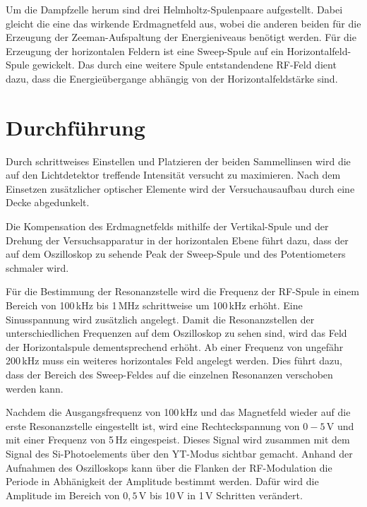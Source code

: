 \noindent Um die Dampfzelle herum sind drei Helmholtz-Spulenpaare aufgestellt. Dabei gleicht die eine das wirkende
Erdmagnetfeld aus, wobei die anderen beiden für die Erzeugung der Zeeman-Aufspaltung der
Energieniveaus benötigt werden. Für die Erzeugung der horizontalen Feldern ist eine Sweep-Spule auf ein Horizontalfeld-Spule
gewickelt. \newline
Das durch eine weitere Spule entstandendene RF-Feld dient dazu, dass die Energieübergange abhängig von
der Horizontalfeldstärke sind.

\section{Durchführung}
Durch schrittweises Einstellen und Platzieren der beiden Sammellinsen wird die auf den Lichtdetektor
treffende Intensität versucht zu maximieren. Nach dem Einsetzen zusätzlicher optischer Elemente wird
der Versuchausaufbau durch eine Decke abgedunkelt.

Die Kompensation des Erdmagnetfelds mithilfe der Vertikal-Spule und der Drehung der Versuchsapparatur in der
horizontalen Ebene führt dazu, dass der auf dem Oszilloskop zu sehende Peak der Sweep-Spule und des Potentiometers
schmaler wird.

Für die Bestimmung der Resonanzstelle wird die Frequenz der RF-Spule in einem Bereich von 100\,kHz bis
1\,MHz schrittweise um 100\,kHz erhöht. Eine Sinusspannung wird zusätzlich angelegt.
Damit die Resonanzstellen der unterschiedlichen Frequenzen auf dem Oszilloskop zu sehen sind, wird
das Feld der Horizontalspule dementsprechend erhöht.
Ab einer Frequenz von ungefähr 200\,kHz muss ein weiteres horizontales Feld angelegt werden. Dies führt dazu,
dass der Bereich des Sweep-Feldes auf die einzelnen Resonanzen verschoben werden kann.

Nachdem die Ausgangsfrequenz von 100\,kHz und das Magnetfeld wieder auf die erste Resonanzstelle eingestellt ist,
wird eine Rechteckspannung von $0-5$\,V und mit einer Frequenz von 5\,Hz eingespeist. Dieses Signal
wird zusammen mit dem Signal des Si-Photoelements über den YT-Modus sichtbar gemacht.
Anhand der Aufnahmen des Oszilloskops kann über die Flanken der RF-Modulation
die Periode in Abhänigkeit der Amplitude bestimmt werden. Dafür wird die Amplitude im Bereich von $0,5$\,V bis 10\,V
in 1\,V Schritten verändert.
